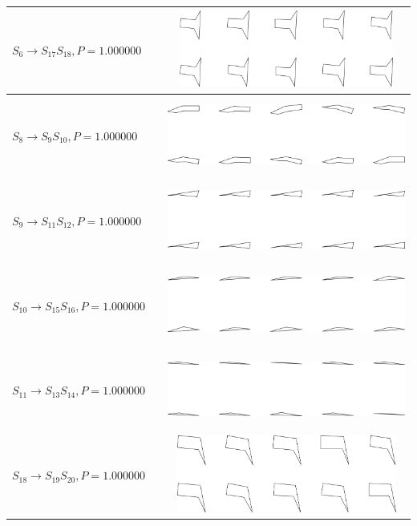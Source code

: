\begin{tabular}{|l|c|c|}

\hline
$S_{6} \to S_{17} S_{18}, P=1.000000$ &  & \includegraphics[height=1in]{output/1.models/hand_built/romerchoice/gram.0006.sample.png} \\
\hline
$S_{8} \to S_{9} S_{10}, P=1.000000$ &  & \includegraphics[height=1in]{output/1.models/hand_built/romerchoice/gram.0007.sample.png} \\
\hline
$S_{9} \to S_{11} S_{12}, P=1.000000$ &  & \includegraphics[height=1in]{output/1.models/hand_built/romerchoice/gram.0008.sample.png} \\
\hline
$S_{10} \to S_{15} S_{16}, P=1.000000$ &  & \includegraphics[height=1in]{output/1.models/hand_built/romerchoice/gram.0009.sample.png} \\
\hline
$S_{11} \to S_{13} S_{14}, P=1.000000$ &  & \includegraphics[height=1in]{output/1.models/hand_built/romerchoice/gram.0010.sample.png} \\
\hline
$S_{18} \to S_{19} S_{20}, P=1.000000$ &  & \includegraphics[height=1in]{output/1.models/hand_built/romerchoice/gram.0011.sample.png} \\
\hline
\end{tabular}

